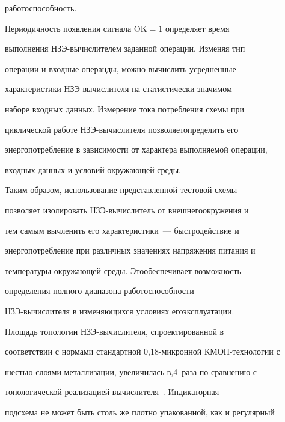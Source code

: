 работоспособность.





   Периодичность появления сигнала $\mathrm{OK}=1$ определяет время


выполнения НЗЭ-вы\-чис\-ли\-те\-лем заданной операции. Изменяя тип


операции и входные операнды, можно вычислить усредненные


характеристики НЗЭ-вы\-чис\-ли\-те\-ля на статистически значимом


наборе входных данных. Измерение тока потребления схемы при


циклической работе НЗЭ-вы\-чис\-ли\-те\-ля позволяет\linebreak  определить его


энергопотребление в зависимости от характера выполняемой операции,


входных данных и условий окружающей среды.





   Таким образом, использование представленной тестовой схе\-мы


позволяет изолировать НЗЭ-вы\-чис\-ли\-тель от внешнего\linebreak окруже\-ния и


тем самым вычленить его характеристики~--- быст\-ро\-действие и


энергопотребление при различных значениях напряжения питания и


температуры окружающей среды. Это\linebreak обеспечивает возможность


определения полного диапазона работоспособности


   НЗЭ-вы\-чис\-ли\-те\-ля в изменяющихся условиях его\linebreak эксплуатации.





   Площадь топологии НЗЭ-вычислителя, спроектированной в


соответствии с нормами стандартной 0,18-мик\-рон\-ной КМОП-тех\-но\-ло\-гии с


шестью слоями металлизации, увеличилась в,4~раза по сравнению с


топологической реализацией вы\-чис\-ли\-те\-ля~\cite{9-1}. Индикаторная


подсхема не может быть столь же плотно упакованной, как и регулярный


